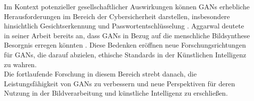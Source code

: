Im Kontext potenzieller gesellschaftlicher Auswirkungen können GANs erhebliche Herausforderungen im Bereich der Cybersicherheit darstellen, insbesondere hinsichtlich Gesichtserkennung und Passwortentschlüsselung \cite{Hitaj.912017}. Aggarwal deutete in seiner Arbeit bereits an, dass GANs in Bezug auf die menschliche Bildsynthese Besorgnis erregen könnten \cite{Aggarwal.2021}. Diese Bedenken eröffnen neue Forschungsrichtungen für GANs, die darauf abzielen, ethische Standards in der Künstlichen Intelligenz zu wahren.
\\
Die fortlaufende Forschung in diesem Bereich strebt danach, die Leistungsfähigkeit von GANs zu verbessern und neue Perspektiven für deren Nutzung in der Bildverarbeitung und künstliche Intelligenz zu erschließen.